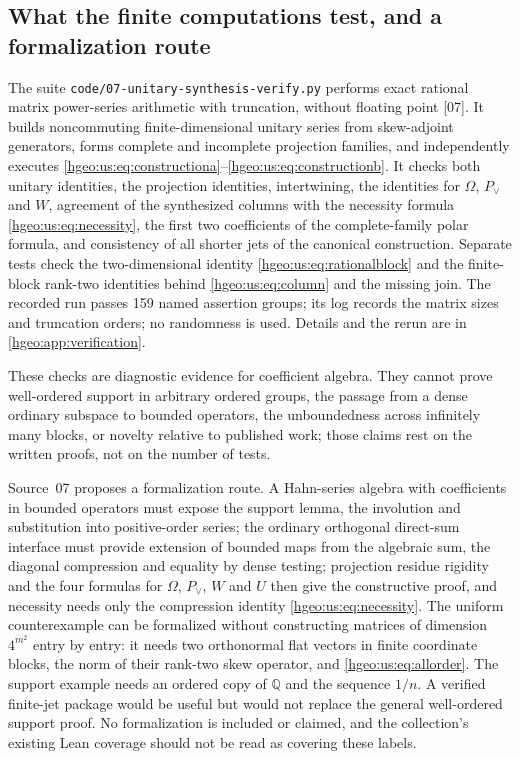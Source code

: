 \documentclass[11pt,letterpaper]{article}
\numberwithin{equation}{section}
\theoremstyle{definition}
\theoremstyle{remark}
\newcommand{\Q}{\mathbb Q}
\newcommand{\src}[1]{\textup{\textsf{\small[#1]}}}
\newcommand{\fn}[1]{\nolinkurl{#1}}
\begin{document}
\subsection{What the finite computations test, and a formalization route}
\label{hgeo:us:sub:verification}
The suite \fn{code/07-unitary-synthesis-verify.py} performs exact rational
matrix power-series arithmetic with truncation, without floating point
\src{07}. It builds noncommuting finite-dimensional unitary series from
skew-adjoint generators, forms complete and incomplete projection families,
and independently executes
\eqref{hgeo:us:eq:constructiona}--\eqref{hgeo:us:eq:constructionb}. It checks
both unitary identities, the projection identities, intertwining, the
identities for $\Omega$, $P_\vee$ and $W$, agreement of the synthesized
columns with the necessity formula \eqref{hgeo:us:eq:necessity}, the first two
coefficients of the complete-family polar formula, and consistency of all
shorter jets of the canonical construction. Separate tests check the
two-dimensional identity \eqref{hgeo:us:eq:rationalblock} and the finite-block
rank-two identities behind \eqref{hgeo:us:eq:column} and the missing join. The
recorded run passes 159 named assertion groups; its log records the matrix
sizes and truncation orders; no randomness is used. Details and the rerun are
in \cref{hgeo:app:verification}.

These checks are diagnostic evidence for coefficient algebra. They cannot
prove well-ordered support in arbitrary ordered groups, the passage from a
dense ordinary subspace to bounded operators, the unboundedness across
infinitely many blocks, or novelty relative to published work; those claims
rest on the written proofs, not on the number of tests.

Source~07 proposes a formalization route. A Hahn-series algebra with
coefficients in bounded operators must expose the support lemma, the
involution and substitution into positive-order series; the ordinary
orthogonal direct-sum interface must provide extension of bounded maps from
the algebraic sum, the diagonal compression and equality by dense testing;
projection residue rigidity and the four formulas for $\Omega$, $P_\vee$, $W$
and $U$ then give the constructive proof, and necessity needs only the
compression identity \eqref{hgeo:us:eq:necessity}. The uniform counterexample
can be formalized without constructing matrices of dimension $4^{m^2}$ entry by
entry: it needs two orthonormal flat vectors in finite coordinate blocks, the
norm of their rank-two skew operator, and \eqref{hgeo:us:eq:allorder}. The
support example needs an ordered copy of $\Q$ and the sequence $1/n$. A
verified finite-jet package would be useful but would not replace the general
well-ordered support proof. No formalization is included or claimed, and the
collection's existing Lean coverage should not be read as covering these
labels.
\end{document}
